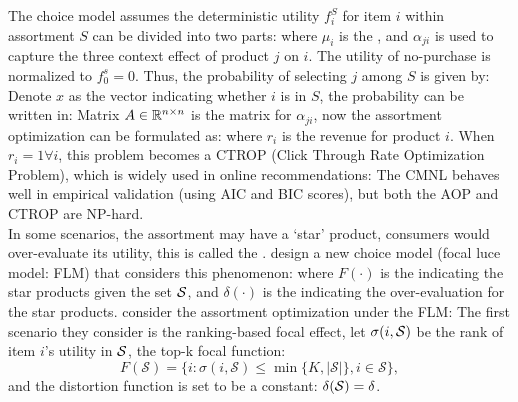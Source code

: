 \documentclass[12pt]{report}
\begin{document}
The choice model assumes the deterministic utility $f_i^S$ for item $i$ within assortment $S$ can be divided into two parts:
where $\mu_i$ is the , and $\alpha_{ji}$ is used to capture the three context effect of product $j$ on $i$. 
The utility of no-purchase is normalized to $f_0^s=0$. 
Thus, the probability of selecting $j$ among $S$ is given by:
Denote $x$ as the vector indicating whether $i$ is in $S$, the probability can be written in:
Matrix $A\in\RR^{n\times n}$ is the matrix for $\alpha_{ji}$, now the assortment optimization can be formulated as:
where $r_i$ is the revenue for product $i$. 
When $r_i=1\forall i$, this problem becomes a CTROP (Click Through Rate Optimization Problem), which is widely used in online recommendations:
The CMNL behaves well in empirical validation (using AIC and BIC scores), but both the AOP and CTROP are NP-hard. \\
In some scenarios, the assortment may have a `star' product, consumers would over-evaluate its utility, this is called the . 
\cite{kovach2022focal} design a new choice model (focal luce model: FLM) that considers this phenomenon:
where $F(\cdot)$ is the  indicating the star products given the set $\mathcal{S}$, and $\delta(\cdot)$ is the  indicating the over-evaluation for the star products. 
\cite{jiang2023assortment} consider the assortment optimization under the FLM:
The first scenario they consider is the ranking-based focal effect, let $\sigma(i,\mathcal{S})$ be the rank of item $i$'s utility in $\mathcal{S}$, the top-k focal function:
\[
    F(\mathcal{S})=\{i:\sigma(i,\mathcal{S})\leq\min\{K,|\mathcal{S}|\},i\in\mathcal{S}\},
\]
and the distortion function is set to be a constant: $\delta(\mathcal{S})=\delta$.
\end{document}
